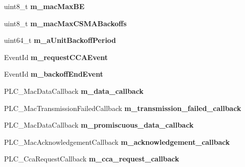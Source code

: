 \begin{DoxyCompactItemize}
\item 
\hypertarget{classns3_1_1PLC__Mac_af468edf28b12cca74ca95686e7be30b4}{uint8\-\_\-t {\bfseries m\-\_\-mac\-Max\-B\-E}}\label{classns3_1_1PLC__Mac_af468edf28b12cca74ca95686e7be30b4}

\item 
\hypertarget{classns3_1_1PLC__Mac_a426543cb44d6f20ff0e5d02b2ec56f3d}{uint8\-\_\-t {\bfseries m\-\_\-mac\-Max\-C\-S\-M\-A\-Backoffs}}\label{classns3_1_1PLC__Mac_a426543cb44d6f20ff0e5d02b2ec56f3d}

\item 
\hypertarget{classns3_1_1PLC__Mac_ae83250f3875668abca3605821cf52273}{uint64\-\_\-t {\bfseries m\-\_\-a\-Unit\-Backoff\-Period}}\label{classns3_1_1PLC__Mac_ae83250f3875668abca3605821cf52273}

\item 
\hypertarget{classns3_1_1PLC__Mac_a593500e52fdad245e78e6e5150f67813}{\-Event\-Id {\bfseries m\-\_\-request\-C\-C\-A\-Event}}\label{classns3_1_1PLC__Mac_a593500e52fdad245e78e6e5150f67813}

\item 
\hypertarget{classns3_1_1PLC__Mac_a7c278fc1000cccbe7bacf59c41df60b8}{\-Event\-Id {\bfseries m\-\_\-backoff\-End\-Event}}\label{classns3_1_1PLC__Mac_a7c278fc1000cccbe7bacf59c41df60b8}

\item 
\hypertarget{classns3_1_1PLC__Mac_a28406aa33e1606a6eac7f3ea26d88dad}{\-P\-L\-C\-\_\-\-Mac\-Data\-Callback {\bfseries m\-\_\-data\-\_\-callback}}\label{classns3_1_1PLC__Mac_a28406aa33e1606a6eac7f3ea26d88dad}

\item 
\hypertarget{classns3_1_1PLC__Mac_a064a0a0421abcc3c7296bec2336561d7}{\-P\-L\-C\-\_\-\-Mac\-Transmission\-Failed\-Callback {\bfseries m\-\_\-transmission\-\_\-failed\-\_\-callback}}\label{classns3_1_1PLC__Mac_a064a0a0421abcc3c7296bec2336561d7}

\item 
\hypertarget{classns3_1_1PLC__Mac_a3275f60b38b8a35f4e87653939e68eab}{\-P\-L\-C\-\_\-\-Mac\-Data\-Callback {\bfseries m\-\_\-promiscuous\-\_\-data\-\_\-callback}}\label{classns3_1_1PLC__Mac_a3275f60b38b8a35f4e87653939e68eab}

\item 
\hypertarget{classns3_1_1PLC__Mac_a1b435771a36fe2133a8930b03011e0ae}{\-P\-L\-C\-\_\-\-Mac\-Acknowledgement\-Callback {\bfseries m\-\_\-acknowledgement\-\_\-callback}}\label{classns3_1_1PLC__Mac_a1b435771a36fe2133a8930b03011e0ae}

\item 
\hypertarget{classns3_1_1PLC__Mac_ac8a358c85a1a77cb882bfc065daaca37}{\-P\-L\-C\-\_\-\-Cca\-Request\-Callback {\bfseries m\-\_\-cca\-\_\-request\-\_\-callback}}\label{classns3_1_1PLC__Mac_ac8a358c85a1a77cb882bfc065daaca37}

\end{DoxyCompactItemize}
